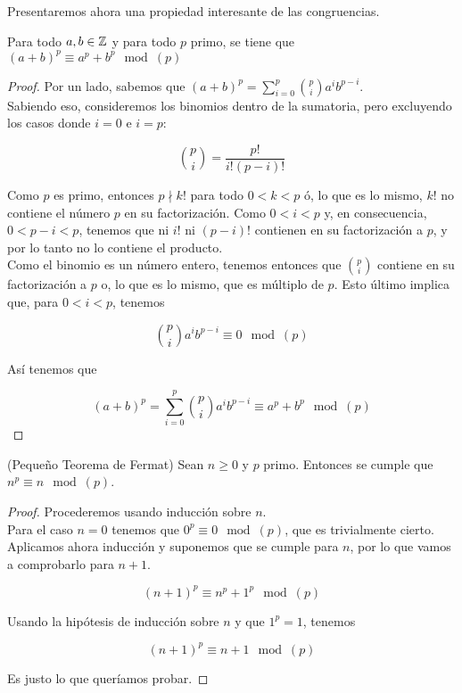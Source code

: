 Presentaremos ahora una propiedad interesante de las congruencias.

\begin{lema}\label{lema_abp_apbp}
	Para todo $a, b \in \mathbb{Z}$ y para todo $p$ primo, se tiene que $(a + b)^p \equiv a^p + b^p \mod(p)$
\end{lema}

\begin{proof}
	Por un lado, sabemos que $(a + b)^p = \sum_{i=0}^{p}\binom{p}{i}a^ib^{p-i}$.\\
	
	Sabiendo eso, consideremos los binomios dentro de la sumatoria, pero excluyendo los casos donde $i = 0$ e $i = p$:
	
	\[ \binom{p}{i} = \frac{p!}{i!(p - i)!} \]
	
	Como $p$ es primo, entonces $p \nmid k!$ para todo $0 < k < p$ ó, lo que es lo mismo, $k!$ no contiene el número $p$ en su factorización. Como $0 < i < p$ y, en consecuencia, $0 < p - i < p$, tenemos que ni $i!$ ni $(p - i)!$ contienen en su factorización a $p$, y por lo tanto no lo contiene el producto.\\
	
	Como el binomio es un número entero, tenemos entonces que $\binom{p}{i}$ contiene en su factorización a $p$ o, lo que es lo mismo, que es múltiplo de $p$. Esto último implica que, para $0 < i < p$, tenemos
	
	\[ \binom{p}{i}a^ib^{p-i} \equiv 0 \mod(p) \]
	
	Así tenemos que
	
	\[ (a + b)^p = \sum_{i=0}^{p}\binom{p}{i}a^ib^{p-i} \equiv a^p + b^p \mod(p) \]
\end{proof}

\begin{teorema}{(Pequeño Teorema de Fermat)}\label{pequenio_teorema_de_fermat}
	Sean $n \geq 0$ y $p$ primo. Entonces se cumple que $n^p \equiv n \mod(p)$.
\end{teorema}

\begin{proof}
	Procederemos usando inducción sobre $n$.\\
	
	Para el caso $n = 0$ tenemos que $0^p \equiv 0 \mod(p)$, que es trivialmente cierto.\\
	
	Aplicamos ahora inducción y suponemos que se cumple para $n$, por lo que vamos a comprobarlo para $n + 1$.
	
	\[ (n + 1)^p \equiv n^p + 1^p \mod(p) \]
	
	Usando la hipótesis de inducción sobre $n$ y que $1^p = 1$, tenemos
	
	\[ (n + 1)^p \equiv n + 1 \mod(p) \]
	
	Es justo lo que queríamos probar.
\end{proof}

